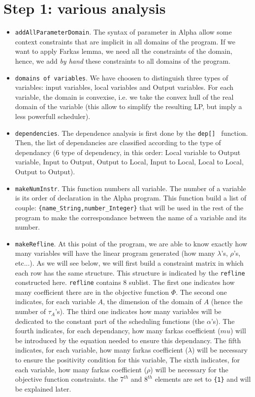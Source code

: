 \section{Step 1: various analysis}
\begin{itemize}
\item {\tt addAllParameterDomain}. The syntax of parameter in Alpha allow 
some context constraints that are implicit in all domains of the \aalpha 
program.  
If we want to apply Farkas lemma, we need all the constraints of the domain, 
hence, we add {\em by hand} these constraints to all domains of the program.

\item {\tt domains of variables}. We have choosen to distinguish three
types of variables: input variables, local variables and Output
variables. For each variable, the domain is convexise, i.e. we take
the convex hull of the real domain of the variable (this allow to
simplify the resulting LP, but imply a less powerfull scheduler).

\item {\tt dependencies}. The dependence analysis is first done 
by the {\tt dep[] } function. Then,  the list of dependancies are 
classified according to the type of dependancy (6 type of dependency, in this 
order: Local variable 
to Output variable, Input to Output, Output to Local,  Input to Local,
Local to Local, Output to Output).

\item {\tt makeNumInstr}. This function numbers all variable. The number 
of a variable is its order of declaration in the Alpha program. 
This function build a list of couple: {\tt  \{name\_String,number\_Integer\}}
 that will be used 
in the rest of the program to make the correspondance between
 the name of a variable and its number. 

\item {\tt makeRefline}. At this point of the program, we are able to
know exactly how many variables will have the linear program generated
(how many $\lambda$'s, $\rho$'s, etc...). As we will see below, we
will first build a constraint matrix in which each row has the same
structure.  This structure is indicated by the {\tt refline}
constructed here.  {\tt refline} contains 8 sublist.  The first one
indicates how many coefficient there are in the objective function
$\Phi$. The second one indicates, for each variable $A$, the dimension
of the domain of $A$ (hence the number of $\tau_A$'s). The third one
indicates how many variables will be dedicated to the constant part of
the scheduling functions (the $\alpha$'s). The fourth indicates, for
each dependancy, how many farkas coefficient ($mu$) will be introduced
by the equation needed to ensure this dependancy. The fifth indicates,
for each variable, how many farkas coefficient ($\lambda$)
 will be necessary to 
ensure the positivity condition for this variable, The sixth indicates, 
for each variable, how many farkas coefficient ($\rho$)
 will be necessary for the objective function  constraints. the $7^{th}$ and 
$8^{th}$ elements are set to {\tt \{1\}} and will be explained later.


\end{itemize}
